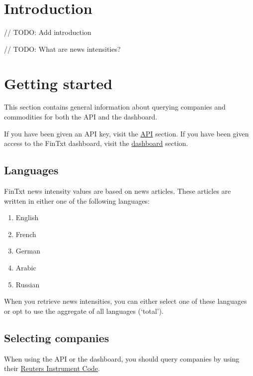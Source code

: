 \documentclass[]{book}
\title{}
\author{}
\date{}
\providecommand{\tightlist}{%
  \setlength{\itemsep}{0pt}\setlength{\parskip}{0pt}}
\theoremstyle{definition}
\theoremstyle{definition}
\theoremstyle{definition}
\theoremstyle{remark}
\begin{document}
{
\setcounter{tocdepth}{1}
\tableofcontents
}
\chapter{Introduction}\label{intro}

// TODO: Add introduction

// TODO: What are news intensities?

\chapter{Getting started}\label{gettinstarted}

This section contains general information about querying companies and
commodities for both the API and the dashboard.

If you have been given an API key, visit the
\href{https://fintxt.github.io/documentation/theapi.html}{API} section.
If you have been given access to the FinTxt dashboard, visit the
\href{https://fintxt.github.io/documentation/thedashboard.html}{dashboard}
section.

\section{Languages}\label{languages}

FinTxt news intensity values are based on news articles. These articles
are written in either one of the following languages:

\begin{enumerate}
\def\labelenumi{\arabic{enumi}.}
\tightlist
\item
  English
\item
  French
\item
  German
\item
  Arabic
\item
  Russian
\end{enumerate}

When you retrieve news intensities, you can either select one of these
languages or opt to use the aggregate of all languages (`total').

\section{Selecting companies}\label{selecting-companies}

When using the API or the dashboard, you should query companies by using
their
\href{https://en.wikipedia.org/wiki/Reuters_Instrument_Code}{Reuters
Instrument Code}.
\end{document}
